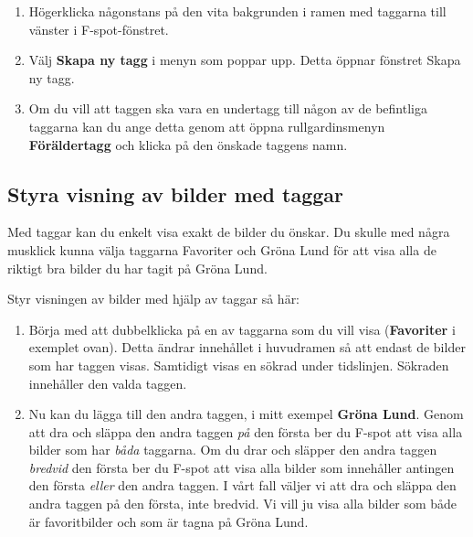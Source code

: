 \documentclass[a4paper,final]{memoir} %
\begin{document}
\begin{enumerate}

\item Högerklicka någonstans på den vita bakgrunden i ramen med taggarna till vänster i F-spot-fönstret.

\item Välj \textbf{Skapa ny tagg} i menyn som poppar upp. Detta öppnar fönstret Skapa ny tagg.

\item Om du vill att taggen ska vara en undertagg till någon av de befintliga taggarna kan du ange detta genom att öppna rullgardinsmenyn \textbf{Föräldertagg} och klicka på den önskade taggens namn. 

\end{enumerate}


\subsection{Styra visning av bilder med taggar}


Med taggar kan du enkelt visa exakt de bilder du önskar. Du skulle med några musklick kunna välja taggarna Favoriter och Gröna Lund för att visa alla de riktigt bra bilder du har tagit på Gröna Lund. 

Styr visningen av bilder med hjälp av taggar så här:

\begin{enumerate}

\item Börja med att dubbelklicka på en av taggarna som du vill visa (\textbf{Favo\-riter} i exemplet ovan). Detta ändrar innehållet i huvudramen så att endast de bilder som har taggen visas. Samtidigt visas en sökrad under tidslinjen. Sökraden innehåller den valda taggen.  

\item Nu kan du lägga till den andra taggen, i mitt exempel \textbf{Gröna Lund}. Genom att dra och släppa den andra taggen \textit{på} den första ber du F-spot att visa alla bilder som har \textit{båda} taggarna. Om du drar och släpper den andra taggen \textit{bredvid} den första ber du F-spot att visa alla bilder som innehåller antingen den första \textit{eller} den andra taggen. I vårt fall väljer vi att dra och släppa den andra taggen på den första, inte bredvid. Vi vill ju visa alla bilder som både är favoritbilder och som är tagna på Gröna Lund.

\end{enumerate}
\end{document}
